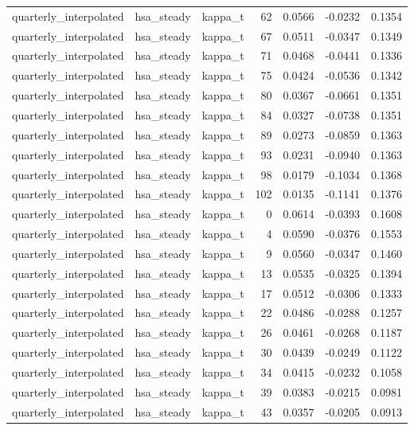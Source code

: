 \begin{tabular}{lllrrrr}
quarterly\_interpolated & hsa\_steady & kappa\_t & 62 & 0.0566 & -0.0232 & 0.1354 \\
quarterly\_interpolated & hsa\_steady & kappa\_t & 67 & 0.0511 & -0.0347 & 0.1349 \\
quarterly\_interpolated & hsa\_steady & kappa\_t & 71 & 0.0468 & -0.0441 & 0.1336 \\
quarterly\_interpolated & hsa\_steady & kappa\_t & 75 & 0.0424 & -0.0536 & 0.1342 \\
quarterly\_interpolated & hsa\_steady & kappa\_t & 80 & 0.0367 & -0.0661 & 0.1351 \\
quarterly\_interpolated & hsa\_steady & kappa\_t & 84 & 0.0327 & -0.0738 & 0.1351 \\
quarterly\_interpolated & hsa\_steady & kappa\_t & 89 & 0.0273 & -0.0859 & 0.1363 \\
quarterly\_interpolated & hsa\_steady & kappa\_t & 93 & 0.0231 & -0.0940 & 0.1363 \\
quarterly\_interpolated & hsa\_steady & kappa\_t & 98 & 0.0179 & -0.1034 & 0.1368 \\
quarterly\_interpolated & hsa\_steady & kappa\_t & 102 & 0.0135 & -0.1141 & 0.1376 \\
quarterly\_interpolated & hsa\_steady & kappa\_t & 0 & 0.0614 & -0.0393 & 0.1608 \\
quarterly\_interpolated & hsa\_steady & kappa\_t & 4 & 0.0590 & -0.0376 & 0.1553 \\
quarterly\_interpolated & hsa\_steady & kappa\_t & 9 & 0.0560 & -0.0347 & 0.1460 \\
quarterly\_interpolated & hsa\_steady & kappa\_t & 13 & 0.0535 & -0.0325 & 0.1394 \\
quarterly\_interpolated & hsa\_steady & kappa\_t & 17 & 0.0512 & -0.0306 & 0.1333 \\
quarterly\_interpolated & hsa\_steady & kappa\_t & 22 & 0.0486 & -0.0288 & 0.1257 \\
quarterly\_interpolated & hsa\_steady & kappa\_t & 26 & 0.0461 & -0.0268 & 0.1187 \\
quarterly\_interpolated & hsa\_steady & kappa\_t & 30 & 0.0439 & -0.0249 & 0.1122 \\
quarterly\_interpolated & hsa\_steady & kappa\_t & 34 & 0.0415 & -0.0232 & 0.1058 \\
quarterly\_interpolated & hsa\_steady & kappa\_t & 39 & 0.0383 & -0.0215 & 0.0981 \\
quarterly\_interpolated & hsa\_steady & kappa\_t & 43 & 0.0357 & -0.0205 & 0.0913 \\

\end{tabular}
